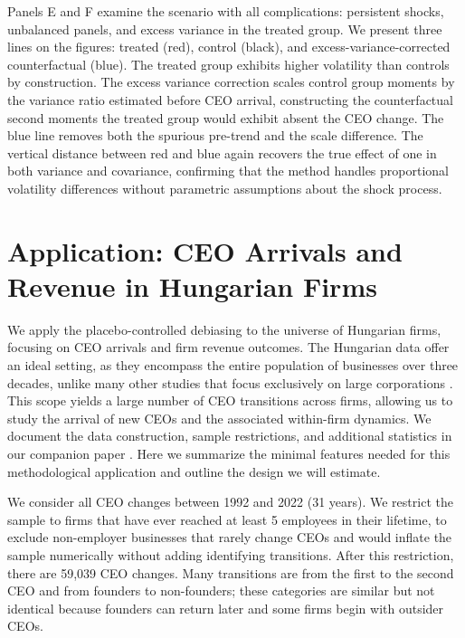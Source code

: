 \documentclass[11pt,a4paper]{article}
\begin{document}
Panels E and F examine the scenario with all complications: persistent shocks, unbalanced panels, and excess variance in the treated group. We present three lines on the figures: treated (red), control (black), and excess-variance-corrected counterfactual (blue). The treated group exhibits higher volatility than controls by construction. The excess variance correction scales control group moments by the variance ratio estimated before CEO arrival, constructing the counterfactual second moments the treated group would exhibit absent the CEO change. The blue line removes both the spurious pre-trend and the scale difference. The vertical distance between red and blue again recovers the true effect of one in both variance and covariance, confirming that the method handles proportional volatility differences without parametric assumptions about the shock process.

\section{Application: CEO Arrivals and Revenue in Hungarian Firms}

We apply the placebo-controlled debiasing to the universe of Hungarian firms, focusing on CEO arrivals and firm revenue outcomes. The Hungarian data offer an ideal setting, as they encompass the entire population of businesses over three decades, unlike many other studies that focus exclusively on large corporations \citep{Bertrand2003-io, crossland2011differences, quigley2015has}. This scope yields a large number of CEO  transitions across firms, allowing us to study the arrival of new CEOs and the associated within-firm dynamics. We document the data construction, sample restrictions, and additional statistics in our companion paper \citep{ceo_value}. Here we summarize the minimal features needed for this methodological application and outline the design we will estimate.

We consider all CEO changes between 1992 and 2022 (31 years). We restrict the sample to firms that have ever reached at least 5 employees in their lifetime, to exclude non-employer businesses that rarely change CEOs and would inflate the sample numerically without adding identifying transitions. After this restriction, there are 59,039 CEO changes. Many transitions are from the first to the second CEO and from founders to non-founders; these categories are similar but not identical because founders can return later and some firms begin with outsider CEOs.
\end{document}
